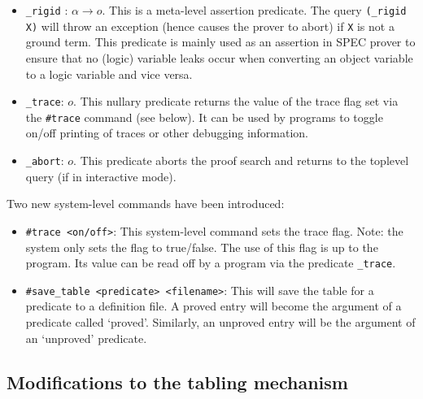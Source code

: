 \documentclass{article}
\newcommand\obj[1]{\texttt{#1}}
\begin{document}
\begin{itemize}
\item \obj{\_rigid} : $\alpha \to o.$ This is a meta-level assertion predicate. 
  The query \obj{(\_rigid X)} will throw an exception (hence causes the prover to abort) if
   \obj{X} is not a ground term. This predicate is mainly used as an assertion
  in SPEC prover to ensure that no (logic) variable leaks occur when converting 
  an object variable to a logic variable and vice versa. 

\item \obj{\_trace}: $o.$ This nullary predicate returns the value of the  
  trace flag set via the  \obj{\#trace} command (see below).
  It can be used by programs to toggle on/off printing of traces or other debugging information. 

\item \obj{\_abort}: $o.$ This predicate aborts the proof search and 
  returns to the toplevel query (if in interactive mode). 

\end{itemize}

Two new system-level commands have been introduced:
\begin{itemize}
\item \obj{\#trace <on/off>}: This system-level command sets the trace flag.
  Note: the system only sets the flag to true/false. The use of this flag is up to the
  program. Its value can be read off by a program via the predicate \obj{\_trace}.

\item \obj{\#save\_table <predicate> <filename>}: This will save the table for a predicate to
  a definition file. A proved entry will become the argument of a predicate called `proved'. 
  Similarly, an unproved entry will be the argument of an `unproved' predicate. 
  
\end{itemize}

\subsection{Modifications to the tabling mechanism}
\label{sec:tabling}
\end{document}
